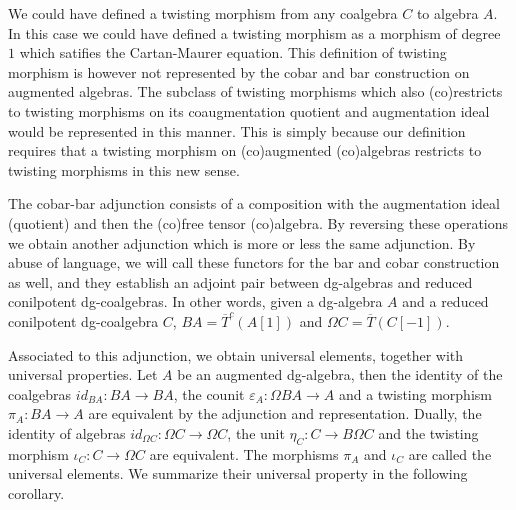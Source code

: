 \documentclass[../thesis.tex]{subfiles}
\begin{document}
            \begin{remark}
                We could have defined a twisting morphism from any coalgebra $C$ to algebra $A$. In this case we could have defined a twisting morphism as a morphism of degree $1$ which satifies the Cartan-Maurer equation. This definition of twisting morphism is however not represented by the cobar and bar construction on augmented algebras. The subclass of twisting morphisms which also (co)restricts to twisting morphisms on its coaugmentation quotient and augmentation ideal would be represented in this manner. This is simply because our definition requires that a twisting morphism on (co)augmented (co)algebras restricts to twisting morphisms in this new sense.

                The cobar-bar adjunction consists of a composition with the augmentation ideal (quotient) and then the (co)free tensor (co)algebra. By reversing these operations we obtain another adjunction which is more or less the same adjunction. By abuse of language, we will call these functors for the bar and cobar construction as well, and they establish an adjoint pair between dg-algebras and reduced conilpotent dg-coalgebras. In other words, given a dg-algebra $A$ and a reduced conilpotent dg-coalgebra $C$, $BA = \overline{T}^c(A[1])$ and $\Omega C = \overline{T}(C[-1])$.
                \begin{center}
                \end{center}
            \end{remark}

            Associated to this adjunction, we obtain universal elements, together with universal properties. Let $A$ be an augmented dg-algebra, then the identity of the coalgebras $id_{BA} : BA \rightarrow BA$, the counit $\varepsilon_A : \Omega BA \rightarrow A$ and a twisting morphism $\pi_A : BA \rightarrow A$ are equivalent by the adjunction and representation. Dually, the identity of algebras $id_{\Omega C} : \Omega C\rightarrow\Omega C$, the unit $\eta_C : C \rightarrow B\Omega C$ and the twisting morphism $\iota_C : C\rightarrow \Omega C$ are equivalent. The morphisms $\pi_A$ and $\iota_C$ are called the universal elements. We summarize their universal property in the following corollary.
\end{document}
